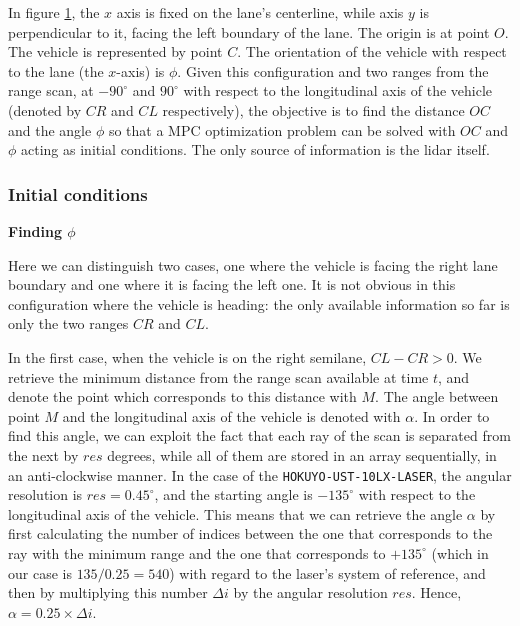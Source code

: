 In figure \ref{fig:centerline_mpc}, the $x$ axis is fixed on the lane's
centerline, while axis $y$ is perpendicular to it, facing the left boundary of
the lane. The origin is at point
$O$. The vehicle is represented by point $C$. The orientation of the vehicle
with respect to the lane (the $x$-axis) is $\phi$. Given this configuration
and two ranges from the range scan, at $-90^{\circ}$ and $90^{\circ}$ with
respect to the longitudinal axis of the vehicle (denoted by $CR$ and
$CL$ respectively), the objective is to find the distance $OC$ and the angle
$\phi$ so that a MPC optimization problem can be solved with $OC$ and $\phi$
acting as initial conditions. The only source of information is the lidar itself.

\begin{figure}[H]\centering
  \scalebox{1}{}
  \caption{}
  \label{fig:centerline_mpc}
\end{figure}


\subsubsection{Initial conditions}

\textbf{Finding $\phi$}


Here we can distinguish two cases, one where the vehicle is facing the right
lane boundary and one where it is facing the left one. It is not obvious
in this configuration where the vehicle is heading: the only available
information so far is only the two ranges $CR$ and $CL$.

In the first case, when the vehicle is on the right semilane, $CL-CR > 0$.
We retrieve the minimum distance from the range scan available at time $t$,
and denote the point which corresponds to this distance with $M$. The angle
between point $M$ and the longitudinal axis of the vehicle is denoted with
$\alpha$. In order to find this angle, we can exploit the fact that each ray
of the scan is separated from the next by $res$ degrees, while all of them
are stored in an array sequentially, in an anti-clockwise manner. In the case
of the \texttt{HOKUYO-UST-10LX-LASER}, the angular resolution is
$res=0.45^{\circ}$, and the starting angle is $-135^{\circ}$ with respect to the
longitudinal axis of the vehicle. This means that we can retrieve the angle
$\alpha$ by first calculating the number of indices between the one that
corresponds to the ray with the minimum range and the one that corresponds
to $+135^{\circ}$ (which in our case is $135 / 0.25 = 540$) with regard to the
laser's system of reference, and then by multiplying this number $\Delta i$ by
the angular resolution $res$. Hence, $\alpha = 0.25 \times \Delta i$.


